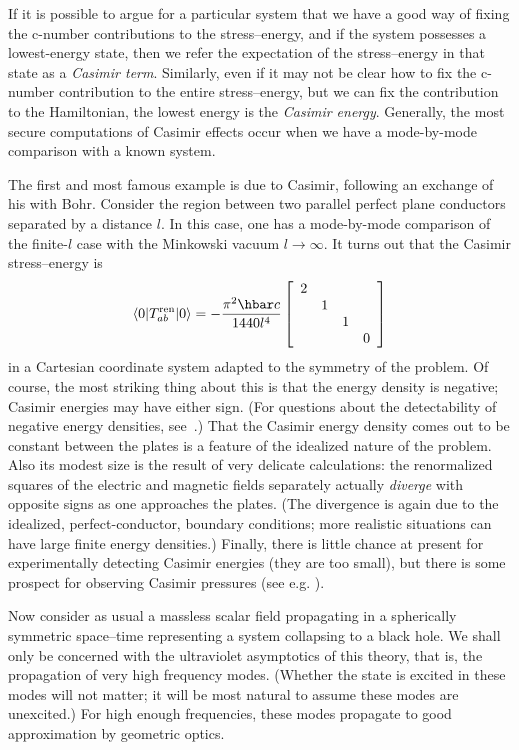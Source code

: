 \documentclass[
%
draft    %
,numberedheadings 
,bibliocites
  ]
  {aipproc}
\begin{document}
If it is possible to argue for a particular system that we have a good way of fixing the 
c-number contributions to the stress--energy, and if the system possesses a lowest-energy state, then we refer the expectation of the stress--energy in that state as a {\em Casimir term}.  Similarly, even if it may not be clear how to fix the c-number contribution to the entire stress--energy, but we can fix the contribution to the Hamiltonian, the lowest energy is the {\em Casimir energy}.  Generally, the most secure computations of Casimir effects occur when we have a mode-by-mode comparison with a known system.

The first and most famous example is due to Casimir, following an exchange of his with Bohr.  Consider the region between two parallel  perfect plane conductors separated by a distance $l$.
In this case, one has a mode-by-mode comparison of the finite-$l$ case with the Minkowski vacuum $l\to\infty$.  It turns out that the Casimir stress--energy is
\begin{equation}\label{Cas}
  \langle 0 |T_{ab}^{\rm ren}|0\rangle =-\frac{\pi ^2\hbar c}{1440 l^4}\left[
  \begin{array}{cccc} 2&&&\\ &1&&\\ &&1&\\&&&0\end{array}\right]
\end{equation}
in a Cartesian coordinate system adapted to the symmetry of the problem.  Of course, the most striking thing about this is that the energy density is negative; Casimir energies may have either sign.
(For questions about the detectability of negative energy densities, see~\citep{Helfer:1998}.)  
That the Casimir energy density comes out to be constant between the plates is a feature of the idealized nature of the problem.  Also its modest size is the result of very delicate calculations:  the renormalized squares of the electric and magnetic fields separately actually {\em diverge} with opposite signs as one approaches the plates.  (The divergence is again due to the idealized, perfect-conductor, boundary conditions; more realistic situations can have large finite energy densities.)
Finally, there is little chance at present for experimentally detecting Casimir energies (they are too small), but there is some prospect for observing Casimir pressures (see e.g. \citep{Lamoreaux:2010,KM:2010}).

Now consider as usual a massless scalar field propagating in a spherically symmetric space--time representing a system collapsing to a black hole.  We shall only be concerned with the ultraviolet asymptotics of this theory, that is, the propagation of very high frequency modes.  (Whether the state is excited in these modes will not matter; it will be most natural to assume these modes are unexcited.)  For high enough frequencies, these modes propagate to good approximation by geometric optics.  
\end{document}
